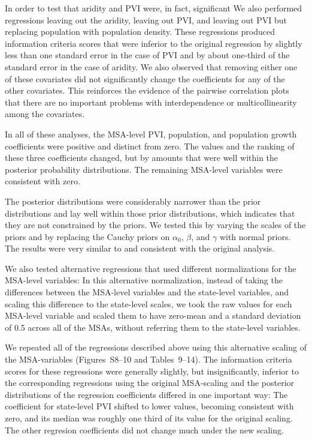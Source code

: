 \documentclass[draft]{agujournal}\usepackage{knitr}
\begin{document}
In order to test that aridity and PVI were, in fact, significant We also performed
regressions leaving out the aridity, leaving out PVI, and leaving out PVI
but replacing population with population density.
These regressions produced information criteria scores that were inferior to the
original regression by slightly less than one standard error in the case of PVI
and by about one-third of the standard error in the case of aridity.
We also observed that removing either one of these covariates did not significantly
change the coefficients for any of the other covariates. This reinforces the evidence
of the pairwise correlation plots that there are no important problems with
interdependence or multicollinearity among the covariates.

In all of these analyses, the MSA-level PVI, population, and population
growth coefficients were positive and distinct from zero. The values and the
ranking of these three coefficients changed, but by amounts that were well
within the posterior probability distributions. The remaining MSA-level
variables were consistent with zero.

The posterior distributions were considerably narrower than the prior
distributions and lay well within those prior distributions,
which indicates that they are not constrained by the priors.
We tested this by varying the scales of the priors and by
replacing the Cauchy priors on $\alpha_0$, $\beta$, and $\gamma$ with normal
priors.
The results were very similar to and consistent with the original analysis.

We also tested alternative regressions that used different normalizations for the
MSA-level variables: In this alternative normalization, instead of taking the
differences between the MSA-level variables and the state-level variables, and
scaling this difference to the state-level scales, we took the raw values for
each MSA-level variable and scaled them to have zero-mean and a standard deviation
of 0.5 across all of the MSAs, without referring them to the state-level variables.

We repeated all of the regressions described above using this alternative scaling
of the MSA-variables (Figures~S8--10 and Tables~9--14).
The information criteria scores for these regressions were generally slightly,
but insignificantly, inferior to the corresponding regressions using the original
MSA-scaling and the posterior distributions of the regression coefficients
differed in one important way: The coefficient for state-level PVI shifted to
lower values, becoming consistent with zero, and its
median was roughly one third of its value for the original scaling.
The other regresion coefficients did not change much under the new scaling.
\end{document}
